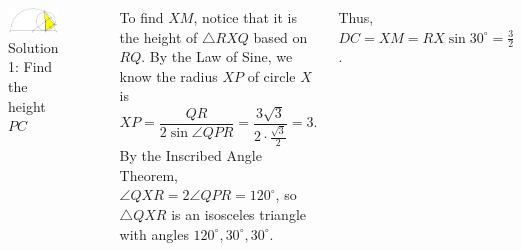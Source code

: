 \documentclass[professionalfont, 12pt, handout, t]{beamer} %
\theoremstyle{plain}
\theoremstyle{definition}
\begin{document}
\begin{frame}{}
    \begin{columns}    
        \begin{figure}[h]
            \centering
            \includegraphics[scale=0.3]{Geometry Solution 1.PNG}
            \captionsetup{labelformat=empty}
            \caption{Solution 1: Find the height $PC$}
        \end{figure}

        To find $XM$, notice that it is the height of $\triangle RXQ$ based on $RQ$.
        By the Law of Sine, we know the radius $XP$ of circle $X$ is
        \[
            XP = \frac{QR}{2\sin\angle QPR} = \frac{3\sqrt{3}}{2 \cdot \frac{\sqrt{3}}{2}} = 3.
        \]
        \pause
        By the Inscribed Angle Theorem, $\angle QXR = 2 \angle QPR = 120^\circ$, so $\triangle QXR$ is an isosceles triangle with angles $120^\circ, 30^\circ, 30^\circ$.
        \pause
        
        Thus, $DC = XM = RX \sin 30^\circ = \frac{3}{2}$.
    \end{columns}
\end{frame}
\end{document}
